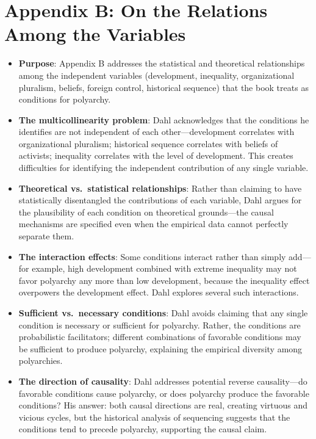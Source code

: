 \documentclass[12pt]{article}
\begin{document}
\section{Appendix B: On the Relations Among the Variables}

\begin{itemize}[leftmargin=*, itemsep=4pt]
    \item \textbf{Purpose}: Appendix B addresses the statistical and theoretical relationships among the independent variables (development, inequality, organizational pluralism, beliefs, foreign control, historical sequence) that the book treats as conditions for polyarchy.
    \item \textbf{The multicollinearity problem}: Dahl acknowledges that the conditions he identifies are not independent of each other---development correlates with organizational pluralism; historical sequence correlates with beliefs of activists; inequality correlates with the level of development. This creates difficulties for identifying the independent contribution of any single variable.
    \item \textbf{Theoretical vs.\ statistical relationships}: Rather than claiming to have statistically disentangled the contributions of each variable, Dahl argues for the plausibility of each condition on theoretical grounds---the causal mechanisms are specified even when the empirical data cannot perfectly separate them.
    \item \textbf{The interaction effects}: Some conditions interact rather than simply add---for example, high development combined with extreme inequality may not favor polyarchy any more than low development, because the inequality effect overpowers the development effect. Dahl explores several such interactions.
    \item \textbf{Sufficient vs.\ necessary conditions}: Dahl avoids claiming that any single condition is necessary or sufficient for polyarchy. Rather, the conditions are probabilistic facilitators; different combinations of favorable conditions may be sufficient to produce polyarchy, explaining the empirical diversity among polyarchies.
    \item \textbf{The direction of causality}: Dahl addresses potential reverse causality---do favorable conditions cause polyarchy, or does polyarchy produce the favorable conditions? His answer: both causal directions are real, creating virtuous and vicious cycles, but the historical analysis of sequencing suggests that the conditions tend to precede polyarchy, supporting the causal claim.

\end{itemize}
\end{document}
